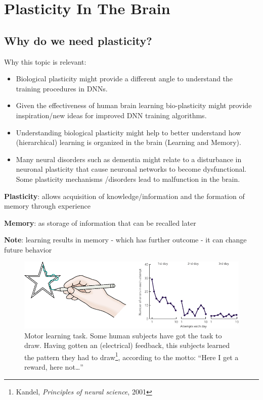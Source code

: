 \documentclass[main]{subfiles}
\begin{document}
\newpage
\section{Plasticity In The Brain}

\subsection{Why do we need plasticity?}
Why this topic is relevant:
\begin{itemize}
    \item Biological plasticity might provide a different angle to understand the training procedures in DNNs.
    \item Given the effectiveness of human brain learning bio-plasticity might provide inspiration/new ideas for improved DNN training algorithms.
    \item Understanding biological plasticity might help to better understand how (hierarchical) learning is organized in the brain (Learning and Memory).
    \item Many neural disorders such as dementia might relate to a disturbance in neuronal plasticity that cause neuronal networks to become dysfunctional. Some plasticity mechanisms /disorders lead to malfunction in the brain.
\end{itemize}

\textbf{Plasticity}: allows acquisition of knowledge/information and the formation of memory through experience

\textbf{Memory}: as storage of information that can be recalled later

\textbf{Note}: learning results in memory - which has further outcome - it can change future behavior

\begin{figure}[H]
    \centering
    \includegraphics[width=\textwidth]{03_PlasticityInTheBrain/figures/motorlearning.jpg}
    \caption{Motor learning task. Some human subjects have got the task to draw. Having gotten an (electrical) feedback, this subjects learned the pattern they had to draw\footnote{Kandel, \textit{Principles of neural science}, 2001}, according to the motto: ``Here I get a reward, here not\ldots''}
    \label{fig:motorlearning}
\end{figure}
\end{document}
